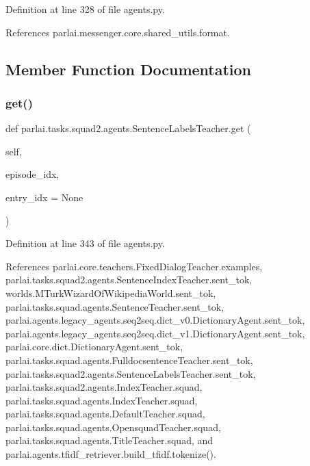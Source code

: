 Definition at line 328 of file agents.\+py.



References parlai.\+messenger.\+core.\+shared\+\_\+utils.\+format.



\subsection{Member Function Documentation}
\mbox{\label{classparlai_1_1tasks_1_1squad2_1_1agents_1_1SentenceLabelsTeacher_a1af54cd1c62193018fa1961bb985908e}} 
\subsubsection{\texorpdfstring{get()}{get()}}
{\footnotesize\ttfamily def parlai.\+tasks.\+squad2.\+agents.\+Sentence\+Labels\+Teacher.\+get (\begin{DoxyParamCaption}\item[{}]{self,  }\item[{}]{episode\+\_\+idx,  }\item[{}]{entry\+\_\+idx = {\ttfamily None} }\end{DoxyParamCaption})}



Definition at line 343 of file agents.\+py.



References parlai.\+core.\+teachers.\+Fixed\+Dialog\+Teacher.\+examples, parlai.\+tasks.\+squad2.\+agents.\+Sentence\+Index\+Teacher.\+sent\+\_\+tok, worlds.\+M\+Turk\+Wizard\+Of\+Wikipedia\+World.\+sent\+\_\+tok, parlai.\+tasks.\+squad.\+agents.\+Sentence\+Teacher.\+sent\+\_\+tok, parlai.\+agents.\+legacy\+\_\+agents.\+seq2seq.\+dict\+\_\+v0.\+Dictionary\+Agent.\+sent\+\_\+tok, parlai.\+agents.\+legacy\+\_\+agents.\+seq2seq.\+dict\+\_\+v1.\+Dictionary\+Agent.\+sent\+\_\+tok, parlai.\+core.\+dict.\+Dictionary\+Agent.\+sent\+\_\+tok, parlai.\+tasks.\+squad.\+agents.\+Fulldocsentence\+Teacher.\+sent\+\_\+tok, parlai.\+tasks.\+squad2.\+agents.\+Sentence\+Labels\+Teacher.\+sent\+\_\+tok, parlai.\+tasks.\+squad2.\+agents.\+Index\+Teacher.\+squad, parlai.\+tasks.\+squad.\+agents.\+Index\+Teacher.\+squad, parlai.\+tasks.\+squad.\+agents.\+Default\+Teacher.\+squad, parlai.\+tasks.\+squad.\+agents.\+Opensquad\+Teacher.\+squad, parlai.\+tasks.\+squad.\+agents.\+Title\+Teacher.\+squad, and parlai.\+agents.\+tfidf\+\_\+retriever.\+build\+\_\+tfidf.\+tokenize().



